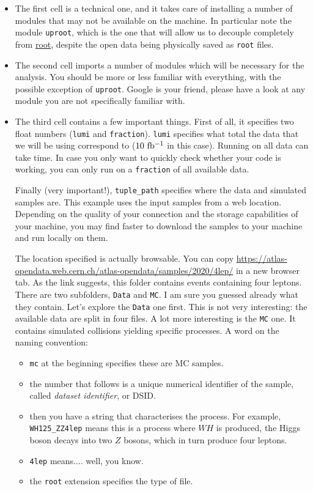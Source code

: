 \begin{itemize}
\item The first cell is a technical one, and it takes care of installing a number of modules that may not be available on the machine. In particular note the module \verb|uproot|, which is the one that will allow us to decouple completely from \href{https://root.cern.ch/}{root}, despite the open data being physically saved as \verb|root| files. 

\item The second cell imports a number of modules which will be necessary for the analysis. You should be more or less familiar with everything, with the possible exception of \verb|uproot|. Google is your friend, please have a look at any module you are not specifically familiar with. 

\item The third cell contains a few important things. First of all, it specifies two float numbers (\verb|lumi| and \verb|fraction|). \verb|lumi| specifies what total \Lint the data that we will be using correspond to ($10\ \ifb$ in this case). Running on all data can take time. In case you only want to quickly check whether your code is working, you can only run on a \verb|fraction| of all available data. 

Finally (very important!), \verb|tuple_path| specifies where the data and simulated samples are. This example uses the input samples from a web location. Depending on the quality of your connection and the storage capabilities of your machine, you may find faster to download the samples to your machine and run locally on them. 

The location specified is actually browsable. You can copy \url{https://atlas-opendata.web.cern.ch/atlas-opendata/samples/2020/4lep/} in a new browser tab. As the link suggests, this folder contains events containing four leptons. There are two subfolders, \verb|Data| and \verb|MC|. I am sure you guessed already what they contain. Let's explore the \verb|Data| one first. This is not very interesting: the available data are split in four files. A lot more interesting is the \verb|MC| one. It contains simulated collisions yielding specific processes. A word on the naming convention: 

\begin{itemize} 
\item \verb|mc| at the beginning specifies these are MC samples. 
\item the number that follows is a unique numerical identifier of the sample, called \textit{dataset identifier}, or DSID. 
\item then you have a string that characterises the process. For example, \verb|WH125_ZZ4lep| means this is a process where $WH$ is produced, the Higgs boson decays into two $Z$ bosons, which in turn produce four leptons. 
\item \verb|4lep| means.... well, you know. 
\item the \verb|root| extension specifies the type of file. 
\end{itemize}  


\end{itemize}
